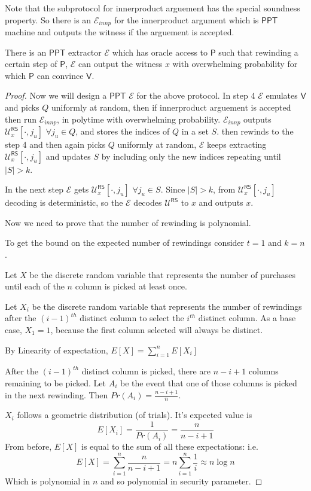 \documentclass[runningheads]{llncs}
\newcommand{\pnote}[1] {\textcolor{red}  {PKP: \sl{#1}}}
\def\ppt{\mathsf{PPT}}
\def\extrac{\mathcal{E}}
\def\prover{\mathsf{P}}
\def\verifier{\mathsf{V}}
\def\RS{\mathsf{RS}} %
\def\calU{\mathcal{U}}
\begin{document}
	Note that the subprotocol for innerproduct arguement has the special soundness property. So there is an $\extrac_{innp}$ for the innerproduct argument which is $\ppt$ machine and outputs the witness if the arguement is accepted.
	\begin{theorem}\label{theo:1}
		There is an $\ppt$ extractor $\extrac$ which has oracle access to $\prover$ such that rewinding a certain step of $\prover$, $\extrac$ can output the witness $x$ with overwhelming probability for which $\prover$ can convince $\verifier$.
	\end{theorem}
	\begin{proof}
		Now we will design a $\ppt$ $\extrac$ for the above protocol.
		In step 4 $\extrac$ emulates $\verifier$ and picks $Q$ uniformly at random, then if innerproduct arguement is accepted then run $\extrac_{innp}$, in polytime with overwhelming probability. $\extrac_{innp}$ outputs $\calU^{\RS}_x[\cdot,j_u]$ $\forall j_u\in Q$, and stores the indices of $Q$ in a set $S$. then rewinds to the step 4 and then again picks $Q$ uniformly at random, $\extrac$ keeps extracting $\calU^{\RS}_x[\cdot,j_u]$ and updates $S$ by including only the new indices repeating until $|S|>k$.
		
		In the next step $\extrac$ gets $\calU^{\RS}_x[\cdot,j_u]$ $\forall j_u \in S$. Since $|S|>k$, from $\calU^{\RS}_x[\cdot,j_u]$ decoding is deterministic, so the $\extrac$ decodes $\calU^{\RS}$ to $x$ and outputs $x$.
		
		Now we need to prove that the number of rewinding is polynomial.
		
		To get the bound on the expected number of rewindings consider $t=1$ and $k=n$. 
		
		Let $X$ be the discrete random variable that represents the number of purchases until each of the $n$ column is picked at least once.
		
		Let $X_i$ be the discrete random variable that represents the number of rewindings after the $(i-1)^{th}$ distinct column to select the $i^{th}$ distinct column. As a base case, $X_1=1$, because the first column selected will always be distinct.
		
		By Linearity of expectation, $E[X]=\sum_{i=1}^{n}E[X_i]$
		
		After the $(i-1)^{th}$ distinct column is picked, there are $n-i+1$ columns remaining to be picked. Let $A_i$ be the event that one of those columns is picked in the next rewinding. Then $Pr(A_i)=\frac{n-i+1}{n}$.
		

		 $X_i$ follows a geometric distribution (of trials). It's expected value is
		 $$E[X_i]= \frac{1}{Pr(A_i)} = \frac{n}{n-i+1}$$
		From before, $E[X]$ is equal to the sum of all these expectations: i.e.
		$$E[X] = \sum\limits_{i=1}^{n} \frac{n}{n-i+1} = n\sum\limits_{i=1}^{n} \frac{1}{i} \approx n \log n$$
		Which is polynomial in $n$ and so polynomial in security parameter.
	\end{proof}
	
\end{document}
